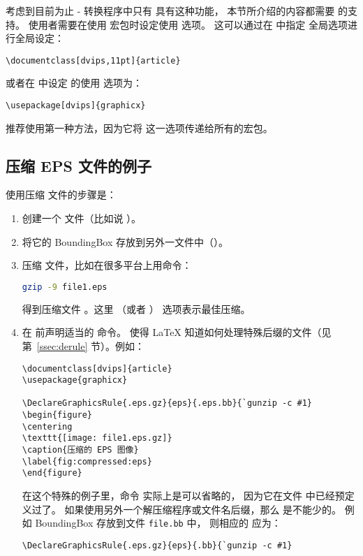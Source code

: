考虑到目前为止 - 转换程序中只有  具有这种功能，
本节所介绍的内容都需要  的支持。
使用者需要在使用  宏包时设定使用  选项。
这可以通过在  中指定  全局选项进行全局设定：
\begin{lstlisting}
\documentclass[dvips,11pt]{article}
\end{lstlisting}
或者在  中设定  的使用  选项为：
\begin{lstlisting}
\usepackage[dvips]{graphicx}
\end{lstlisting}
推荐使用第一种方法，因为它将  这一选项传递给所有的宏包。


\subsection{压缩 EPS 文件的例子}\label{ssec:compresseps}

使用压缩  文件的步骤是：
\begin{enumerate}
	\item 创建一个  文件（比如说 ）。
	\item 将它的 BoundingBox 存放到另外一文件中（）。
	\item 压缩    文件，比如在很多平台上用命令：
	\begin{lstlisting}[language=bash]
	gzip -9 file1.eps
	\end{lstlisting}
	得到压缩文件 。这里 （或者 ） 选项表示最佳压缩。
	\item 在 前声明适当的  命令。
	使得 \LaTeX{} 知道如何处理特殊后缀的文件（见第~\ref{ssec:derule} 节）。例如：
\begin{lstlisting}
\documentclass[dvips]{article}
\usepackage{graphicx}

\DeclareGraphicsRule{.eps.gz}{eps}{.eps.bb}{`gunzip -c #1}
\begin{figure}
\centering
\texttt{[image: file1.eps.gz]}
\caption{压缩的 EPS 图像}
\label{fig:compressed:eps}
\end{figure}

\end{lstlisting}
	在这个特殊的例子里，命令  实际上是可以省略的，
	因为它在文件  中已经预定义过了。
	如果使用另外一个解压缩程序或文件名后缀，那么  是不能少的。
	例如 BoundingBox 存放到文件 \texttt{file.bb} 中，
	则相应的  应为：
\begin{lstlisting}
\DeclareGraphicsRule{.eps.gz}{eps}{.bb}{`gunzip -c #1}
\end{lstlisting}
\end{enumerate}



